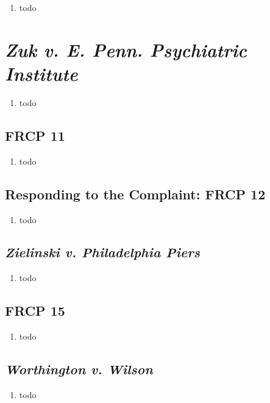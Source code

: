 \begin{enumerate}
    \item todo
\end{enumerate}

\section{\emph{Zuk v. E. Penn. Psychiatric Institute}}

\begin{enumerate}
    \item todo
\end{enumerate}

\subsection{FRCP 11}

\begin{enumerate}
    \item todo
\end{enumerate}

\subsection{Responding to the Complaint: FRCP 12}

\begin{enumerate}
    \item todo
\end{enumerate}

\subsection{\emph{Zielinski v. Philadelphia Piers}}

\begin{enumerate}
    \item todo
\end{enumerate}

\subsection{FRCP 15}

\begin{enumerate}
    \item todo
\end{enumerate}

\subsection{\emph{Worthington v. Wilson}}

\begin{enumerate}
    \item todo
\end{enumerate}
